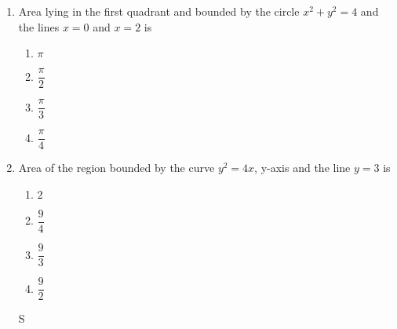 \begin{enumerate} [resume]
\item Area lying in the first quadrant and bounded by the circle ${x}^2 + {y}^2 = 4$ and the lines ${x} = 0$ and ${x} = 2$ is \break
\label{chapters/12/8/1/12}
\begin{enumerate}[itemsep=+2mm]
\item $\pi$
\item $\dfrac{\pi}{2}$
\item $\dfrac{\pi}{3}$  
\item $\dfrac{\pi}{4}$
\end{enumerate}
\item Area of the region bounded by the curve ${y}^2 = 4{x}$, y-axis and the line ${y} = 3$ is
\label{chapters/12/8/1/13}
\begin{enumerate}[itemsep=+2mm]
\item $2$
\item $\dfrac{9}{4}$
\item $\dfrac{9}{3}$  
\item $\dfrac{9}{2}$
\end{enumerate}S
\iffalse

\item 
\label{chapters/12/8/1/11}
%
\item 
\label{chapters/12/8/1/12}
%
\item 
\label{chapters/12/8/1/13}
%
\item Find the area of the region bounded by the curve ${y}^2 = x$ and the line ${x = 1}$, ${x} = 4$ and the x-axis in the first quadrant.
\item Find the area of the region bounded by ${y}^2
= 9{x}$, ${x} = 2$, ${x} = 4$ and the x-axis in the
first quadrant.
\item Find the area of the region in the first quadrant enclosed by x-axis, line ${x} = \sqrt{3} y$ and the circle ${x}^2 + {y}^2
 = 4$.
\item Find the area of the smaller part of the circle ${x}^2 + {y}^2 = {a}^2$ cut off by the line ${x} = \frac{a}{\sqrt{2}}$.
\item The area between ${x} = {y}^2$ and ${x} = 4$ is divided into two equal parts by the line ${x} = {a}$, find the value of ${a}$.
\item Find the area of the region bounded by the parabola ${y} = {x}^2$ and ${y} = |{x}|$.
\item Find the area bounded by the curve ${x}^2 = 4{y}$ and the line ${x} = 4{y} - 2$
	\fi

\end{enumerate}
